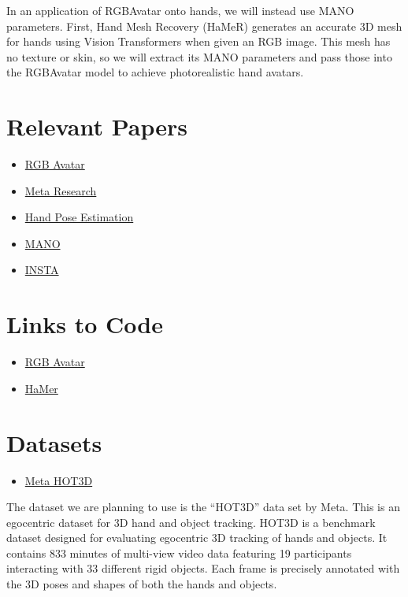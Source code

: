 \documentclass[11pt]{article}
\begin{document}
In an application of RGBAvatar onto hands, we will instead use MANO parameters. First, Hand Mesh Recovery (HaMeR) generates an accurate 3D mesh for hands using Vision Transformers when given an RGB image. This mesh has no texture or skin, so we will extract its MANO parameters and pass those into the RGBAvatar model to achieve photorealistic hand avatars. 

\section{Relevant Papers}

\noindent
\begin{itemize}
    \item \href{https://arxiv.org/pdf/2503.12886}{RGB Avatar}
    \item \href{https://arxiv.org/pdf/2406.09598}{Meta Research}
    \item \href{https://arxiv.org/abs/2404.03159}{Hand Pose Estimation}
    \item \href{https://arxiv.org/pdf/2201.02610}{MANO}
    \item \href{https://arxiv.org/pdf/2211.12499v2}{INSTA}
\end{itemize}

\section{Links to Code}

\noindent
\begin{itemize}
    \item \href{https://github.com/gapszju/RGBAvatar}{RGB Avatar}
    \item \href{https://github.com/geopavlakos/hamer}{HaMer}
\end{itemize}

\section{Datasets}

\noindent
\begin{itemize}
    \item \href{https://facebookresearch.github.io/hot3d/}{Meta HOT3D}
\end{itemize}


The dataset we are planning to use is the “HOT3D” data set by Meta. This is an egocentric dataset for 3D hand and object tracking. HOT3D is a benchmark dataset designed for evaluating egocentric 3D tracking of hands and objects. It contains 833 minutes of multi-view video data featuring 19 participants interacting with 33 different rigid objects. Each frame is precisely annotated with the 3D poses and shapes of both the hands and objects.
\end{document}
